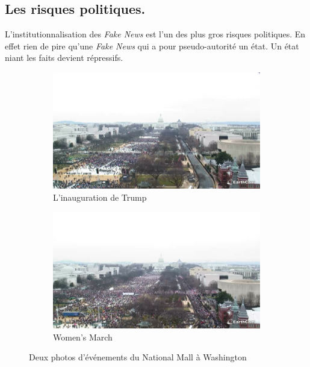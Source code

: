 \documentclass[11pt,a4paper,oldfontcommands]{memoir}
\begin{document}
\subsection{Les risques politiques.}
L'institutionnalisation des \textit{Fake News} est l'un des plus gros risques politiques.
En effet rien de pire qu'une \textit{Fake News} qui a pour pseudo-autorité un état.
Un état niant les faits devient répressifs.
\begin{center}
 \begin{figure}[h]
  \begin{subfigure}{.5\textwidth}
   \includegraphics[scale=0.240]{../../img/trumpvswomen/trump.png}
   \caption{L'inauguration de Trump}
   \label{fig:sub1}
  \end{subfigure}
  \begin{subfigure}{.5\textwidth}
   \includegraphics[scale=0.240]{../../img/trumpvswomen/women.png}
   \caption{Women’s March}
   \label{fig:sub2}
  \end{subfigure}
  \caption{Deux photos d'événements du National Mall à Washington}
  \label{fig:test}
 \end{figure}
\end{center}
\end{document}
